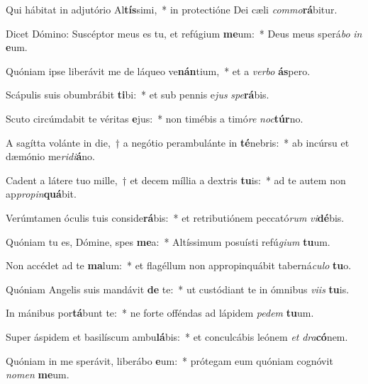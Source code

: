 \item Qui hábitat in adjutório Al\textbf{tís}simi,~* in protectióne Dei cæli \textit{commo}\textbf{rá}bitur.

\item Dicet Dómino: Suscéptor meus es tu, et refúgium \textbf{me}um:~* Deus meus sperá\textit{bo} \textit{in} \textbf{e}um.

\item Quóniam ipse liberávit me de láqueo ve\textbf{nán}tium,~* et a \textit{verbo} \textbf{ás}pero.

\item Scápulis suis obumbrábit \textbf{ti}bi:~* et sub pennis e\textit{jus} \textit{spe}\textbf{rá}bis.

\item Scuto circúmdabit te véritas \textbf{e}jus:~* non timébis a timó\textit{re} \textit{noc}\textbf{túr}no.

\item A sagítta volánte in die,~† a negótio perambulánte in \textbf{té}nebris:~* ab incúrsu et dæmónio me\textit{ridi}\textbf{á}no.

\item Cadent a látere tuo mille,~† et decem míllia a dextris \textbf{tu}is:~* ad te autem non ap\textit{propin}\textbf{quá}bit.

\item Verúmtamen óculis tuis conside\textbf{rá}bis:~* et retributiónem peccató\textit{rum} \textit{vi}\textbf{dé}bis.

\item Quóniam tu es, Dómine, spes \textbf{me}a:~* Altíssimum posuísti refú\textit{gium} \textbf{tu}um.

\item Non accédet ad te \textbf{ma}lum:~* et flagéllum non appropinquábit taberná\textit{culo} \textbf{tu}o.

\item Quóniam Angelis suis mandávit \textbf{de} te:~* ut custódiant te in ómnibus \textit{viis} \textbf{tu}is.

\item In mánibus por\textbf{tá}bunt te:~* ne forte offéndas ad lápidem \textit{pedem} \textbf{tu}um.

\item Super áspidem et basilíscum ambu\textbf{lá}bis:~* et conculcábis leónem \textit{et} \textit{dra}\textbf{có}nem.

\item Quóniam in me sperávit, liberábo \textbf{e}um:~* prótegam eum quóniam cognóvit \textit{nomen} \textbf{me}um.

